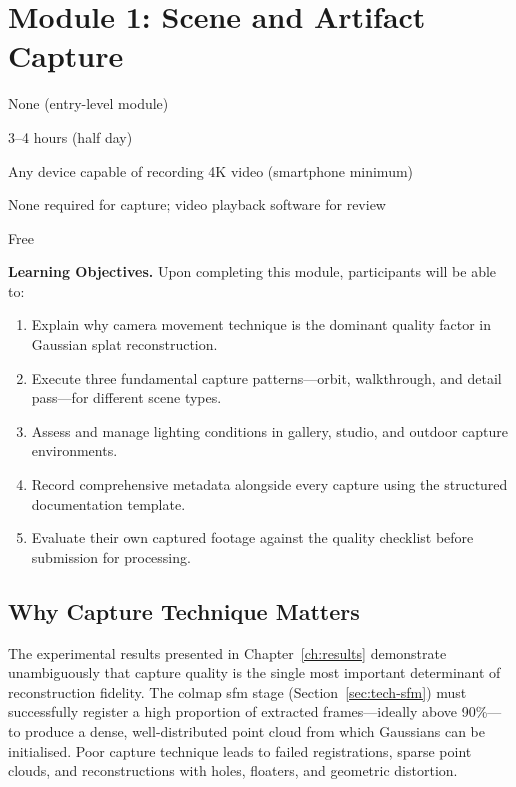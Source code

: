 \chapter{Module 1: Scene and Artifact Capture}
\label{ch:module-capture}

\begin{tcolorbox}[
  enhanced,
  colback=LightGrey,
  colframe=MidGrey,
  fonttitle=\bfseries\sffamily,
  title={Module Information},
  sharp corners=south,
  boxrule=0.6pt
]
\begin{description}[font=\sffamily\bfseries, leftmargin=4cm, style=sameline]
  \item[Prerequisites] None (entry-level module)
  \item[Duration] 3--4 hours (half day)
  \item[Hardware] Any device capable of recording 4K video (smartphone minimum)
  \item[Software] None required for capture; video playback software for review
  \item[Budget tier] Free
\end{description}
\end{tcolorbox}

\medskip

\noindent\textbf{Learning Objectives.} Upon completing this module, participants will be able to:
\begin{enumerate}
  \item Explain why camera movement technique is the dominant quality factor in Gaussian splat reconstruction.
  \item Execute three fundamental capture patterns---orbit, walkthrough, and detail pass---for different scene types.
  \item Assess and manage lighting conditions in gallery, studio, and outdoor capture environments.
  \item Record comprehensive metadata alongside every capture using the structured documentation template.
  \item Evaluate their own captured footage against the quality checklist before submission for processing.
\end{enumerate}

\section{Why Capture Technique Matters}
\label{sec:cap-why}

The experimental results presented in Chapter~\ref{ch:results} demonstrate unambiguously that capture quality is the single most important determinant of reconstruction fidelity. The \acrshort{colmap} \acrlong{sfm} stage (Section~\ref{sec:tech-sfm}) must successfully register a high proportion of extracted frames---ideally above 90\%---to produce a dense, well-distributed point cloud from which Gaussians can be initialised. Poor capture technique leads to failed registrations, sparse point clouds, and reconstructions with holes, floaters, and geometric distortion.

